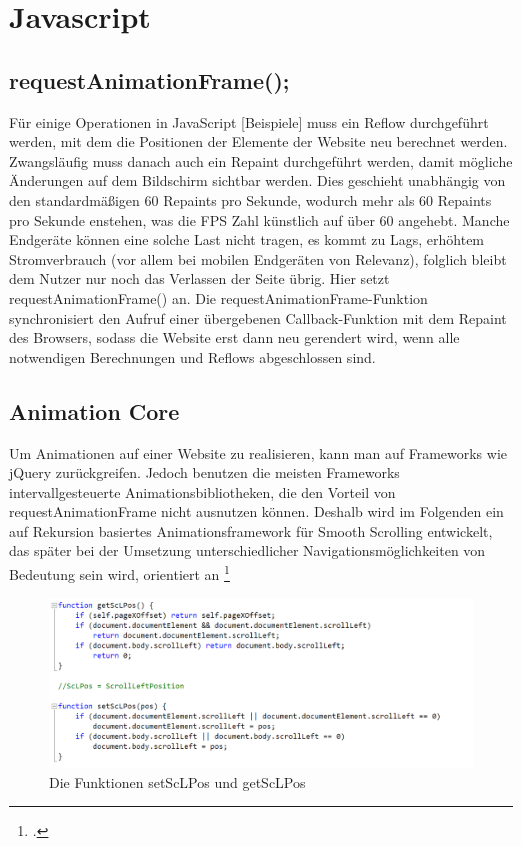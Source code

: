 \section{Javascript}

	\subsection{requestAnimationFrame();}
Für einige Operationen in JavaScript [Beispiele] muss ein Reflow durchgeführt werden, mit dem die Positionen der Elemente der Website neu berechnet werden. Zwangsläufig muss danach auch ein Repaint durchgeführt werden, damit mögliche Änderungen auf dem Bildschirm sichtbar werden. Dies geschieht unabhängig von den standardmäßigen 60 Repaints pro Sekunde, wodurch mehr als 60 Repaints pro Sekunde enstehen, was die FPS Zahl künstlich auf über 60 angehebt. Manche Endgeräte können eine solche Last nicht tragen, es kommt zu Lags, erhöhtem Stromverbrauch (vor allem bei mobilen Endgeräten von Relevanz), folglich bleibt dem Nutzer nur noch das Verlassen der Seite übrig. Hier setzt requestAnimationFrame() an.
Die requestAnimationFrame-Funktion synchronisiert den Aufruf einer übergebenen Callback-Funktion mit dem Repaint des Browsers, sodass die Website erst dann neu gerendert wird, wenn alle notwendigen Berechnungen und Reflows abgeschlossen sind.


\subsection{Animation Core}
Um Animationen auf einer Website zu realisieren, kann man auf Frameworks wie jQuery zurückgreifen. Jedoch benutzen die meisten Frameworks intervallgesteuerte Animationsbibliotheken, die den Vorteil von requestAnimationFrame nicht ausnutzen können. Deshalb wird im Folgenden ein auf Rekursion basiertes Animationsframework für Smooth Scrolling entwickelt, das später bei der Umsetzung unterschiedlicher Navigationsmöglichkeiten von Bedeutung sein wird, orientiert an \footcite[vgl.][]{rAF}

\begin{figure} [h]
\includegraphics[width=\textwidth]{./img/js_get_set.png}
\caption{Die Funktionen setScLPos und getScLPos}
\label{js_get_set}
\end{figure}

